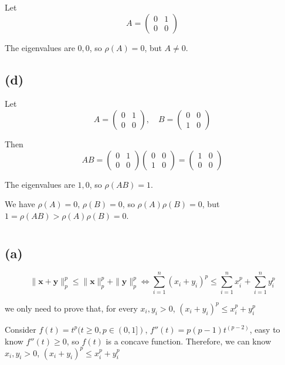 \documentclass{article}
\begin{document}
Let
$$
A=\begin{pmatrix}0&1\\0&0\end{pmatrix}
$$

The eigenvalues are $ 0,0 $, so $ \rho(A)=0 $, but $ A\neq0 $.

\subsection*{(d)}

Let
$$
A=\begin{pmatrix}0&1\\0&0\end{pmatrix}, \quad B=\begin{pmatrix}0&0\\1&0\end{pmatrix}
$$

Then
$$
AB=\begin{pmatrix}0&1\\0&0\end{pmatrix}\begin{pmatrix}0&0\\1&0\end{pmatrix}=\begin{pmatrix}1&0\\0&0\end{pmatrix}
$$

The eigenvalues are $ 1,0 $, so $ \rho(AB)=1 $.

We have $ \rho(A)=0 $, $ \rho(B)=0 $, so $ \rho(A)\rho(B)=0 $, but $ 1=\rho(AB)>\rho(A)\rho(B)=0 $.

\section{}

\subsection*{(a)}
$$
\| \mathbf{x}+\mathbf{y}\|_p^p \leq \| \mathbf{x}\|_p^p +\| \mathbf{y}\|_p^p \Leftrightarrow \sum_{i=1}^{n} (x_i+y_i)^p \leq \sum_{i=1}^{n} x_i^p+\sum_{i=1}^{n}y_i^p
$$

we only need to prove that, for every $x_i, y_i > 0$, $(x_i+y_i)^p \leq  x_i^p+y_i^p$

Consider $f(t)=t^p ( t \geq 0,p\in (0,1])$, $f''(t)=p(p-1)t^(p-2)$, easy to know $f''(t) \geq 0$, so $f(t)$ is a concave function. Therefore, we can know $x_i, y_i > 0$, $(x_i+y_i)^p \leq  x_i^p+y_i^p$
\end{document}
